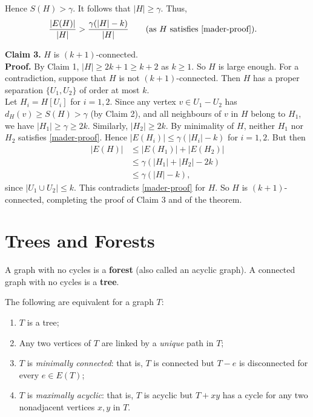 \begin{theorem}[Mader, 1973]
{    Hence \(S(H) > \gamma\). It follows that \(|H| \geq \gamma\). Thus,
    \begin{align*}
        \frac{|E(H)|}{|H|} & > \frac{\gamma(|H|- k)}{|H|} \tag{as \(H\) satisfies \ref{mader-proof}}.
    \end{align*}

    {\bf Claim 3.} \(H\) is \((k + 1)\)-connected. \\
    {\bf Proof.} By Claim 1, \(|H| \geq 2k + 1 \geq k + 2\) as \(k \geq 1\). So \(H\) is large enough. For a contradiction, suppose that \(H\) is not \((k + 1)\)-connected. Then \(H\) has a proper separation \(\{U_1, U_2\}\) of order at most \(k\). \\

    Let \(H_i = H[U_i]\) for \(i = 1, 2\). Since any vertex \(v \in U_1 - U_2\) has \(d_H(v) \geq S(H) > \gamma\) (by Claim 2), and all neighbours of \(v\) in \(H\) belong to \(H_1\), we have \(|H_1| \geq \gamma \geq 2k\). Similarly, \(|H_2| \geq 2k\). By minimality of \(H\), neither \(H_1\) nor \(H_2\) satisfies \ref{mader-proof}. Hence \(|E(H_i)| \leq \gamma(|H_i| - k)\) for \(i = 1, 2\). But then
    \begin{align*}
        |E(H)| & \leq |E(H_1)| + |E(H_2)|                           \\
               & \leq \gamma(|H_1| + |H_2| - 2k)                    \\
               & \leq \gamma(|H| - k), \tag{by inclusion-exclusion}
    \end{align*}
    since \(|U_1 \cup U_2| \leq k\). This contradicts \ref{mader-proof} for \(H\). So \(H\) is \((k + 1)\)-connected, completing the proof of Claim 3 and of the theorem.
    }
\end{theorem}

\section{Trees and Forests}
A graph with no cycles is a \textbf{forest} (also called an acyclic graph). A connected graph with no cycles is a \textbf{tree}.

\begin{theorem} \label{tree-equiv}
    The following are equivalent for a graph \(T\):
    \begin{enumerate}[label=(\roman*)]
        \item \(T\) is a tree;
        \item Any two vertices of \(T\) are linked by a \textit{unique} path in \(T\);
        \item \(T\) is \textit{minimally connected}: that is, \(T\) is connected but \(T - e\) is disconnected for every \(e \in E(T)\);
        \item \(T\) is \textit{maximally acyclic}: that is, \(T\) is acyclic but \(T + xy\) has a cycle for any two nonadjacent vertices \(x, y\) in \(T\).
    \end{enumerate}
\end{theorem}

